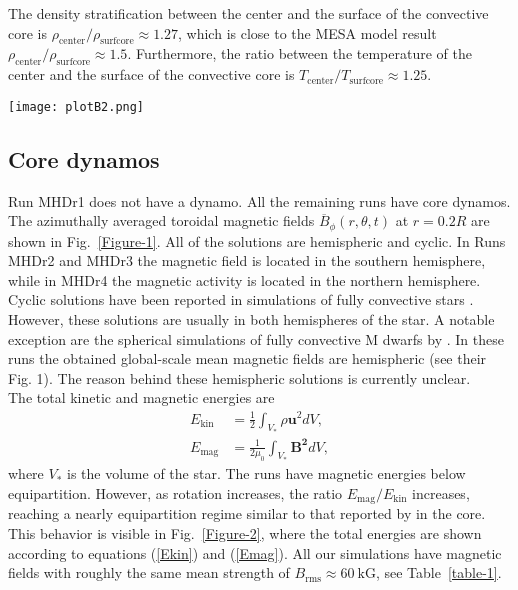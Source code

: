 \documentclass[baaa]{baaa}
\begin{document}
The density stratification between the center and the surface of the convective core is $\rho_\mathrm{center}/\rho_\mathrm{surfcore} \approx 1.27$, which is close to the MESA model result $\rho_\mathrm{center}/\rho_\mathrm{surfcore} \approx 1.5$. Furthermore, the ratio between the temperature of the center and the surface of the convective core is $T_\mathrm{center}/T_\mathrm{surfcore} \approx 1.25$.

\begin{figure*}[!t]
\centering
\texttt{[image: plotB2.png]}
\caption{Time-latitude diagrams of the azimuthally averaged toroidal magnetic field $\overline{B}_\phi (r=0.2R,\theta,t)$. The run is indicated in the upper left corner of each plot.}
\label{Figure-1}
\end{figure*}

\subsection{Core dynamos}
Run MHDr1 does not have a dynamo. All the remaining runs have core dynamos. The azimuthally averaged toroidal magnetic fields $\overline{B}_\phi(r,\theta,t)$ at $r=0.2R$ are shown in Fig.~\ref{Figure-1}. All of the solutions are hemispheric and cyclic. In Runs MHDr2 and MHDr3 the magnetic field is located in the southern hemisphere, while in MHDr4 the magnetic activity is located in the northern hemisphere. Cyclic solutions have been reported in simulations of fully convective stars \citep[see e.g.][]{Kapyla-2021, ortizrodriguez-2023}. However, these solutions are usually in both hemispheres of the star. A notable exception are the spherical simulations of fully convective M dwarfs by \cite{brown-2020}. In these runs the obtained global-scale mean magnetic fields are hemispheric (see their Fig. 1). The reason behind these hemispheric solutions is currently unclear. \\

The total kinetic and magnetic energies are
\begin{align}
    E_\mathrm{kin} &= \frac{1}{2} \int_{V_*}  \rho \bm{u}^2  dV, \label{Ekin} \\ E_\mathrm{mag} &= \frac{1}{2\mu_0} \int_{V_*}  \bm{B^2}  dV, \label{Emag}
\end{align}
where $V_*$ is the volume of the star. The runs have magnetic energies below equipartition. However, as rotation increases, the ratio $E_\mathrm{mag}/E_\mathrm{kin}$ increases, reaching a nearly equipartition regime similar to that reported by \cite{Brun-2005} in the core. This behavior is visible in Fig.~\ref{Figure-2}, where the total energies are shown according to equations (\ref{Ekin}) and (\ref{Emag}). All our simulations have magnetic fields with roughly the same mean strength of $B_\mathrm{rms} \approx 60~\mathrm{kG}$, see Table~\ref{table-1}. 
\end{document}
